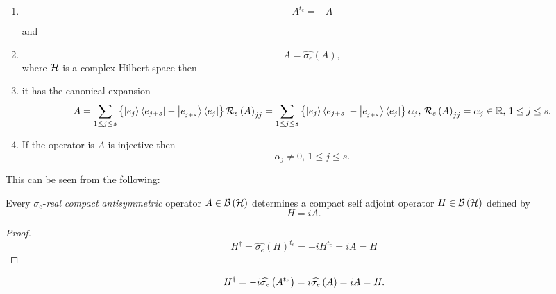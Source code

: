 \begin{enumerate}
\item 
\begin{equation}
A^{t_{e}}=-A
\end{equation}

and

\item 
\begin{equation}
A=\widehat{\sigma _{e}}\left( A\right) ,
\end{equation}%
where ${\cal H}$ is a complex Hilbert space then

\item it has the canonical expansion 
\begin{equation}
A=\sum_{1\leq j\leq s}\left\{ \left\vert e_{j}\right\rangle \left\langle
e_{j+s}\right\vert -\left\vert e_{_{j+s}}\right\rangle \left\langle
e_{j}\right\vert \right\} {\cal R}_{s}\left( A\right) _{jj}=\sum_{1\leq
j\leq s}\left\{ \left\vert e_{j}\right\rangle \left\langle
e_{j+s}\right\vert -\left\vert e_{_{j+s}}\right\rangle \left\langle
e_{j}\right\vert \right\} \alpha _{j},\,{\cal R}_{s}\left( A\right)
_{jj}=\alpha _{j}\in {\Bbb R},\,1\leq j\leq s.  \label{anti}
\end{equation}

\item If the operator is $A$ is injective then 
\begin{equation}
\alpha _{j}\neq 0,\,1\leq j\leq s.
\end{equation}
\end{enumerate}

This can be seen from the following:

\begin{lemma}
Every $\sigma _{e}$-{\em real} {\em compact} {\em antisymmetric} operator $%
A\in {\cal B}\left( {\cal H}\right) $ determines a compact self adjoint
operator $H\in {\cal B}\left( {\cal H}\right) $ defined by 
\begin{equation}
H=iA.
\end{equation}

\begin{proof}
\begin{equation}
H^{\dagger }=\widehat{\sigma _{e}}\left( H\right) ^{t_{e}}=-iH^{t_{e}}=iA=H
\end{equation}
\end{proof}%
\begin{equation}
H^{\dagger }=-i\widehat{\sigma _{e}}\left( A^{t_{e}}\right) =i\widehat{%
\sigma _{e}}\left( A\right) =iA=H.
\end{equation}
\end{lemma}

